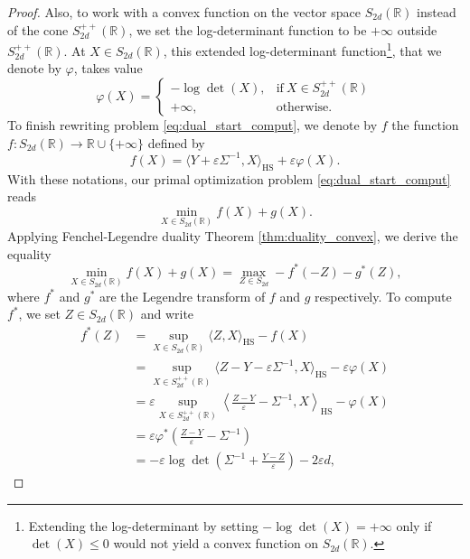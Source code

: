 \documentclass[]{article}
\DeclareMathOperator{\HS}{HS}
\numberwithin{equation}{section}
\theoremstyle{plain}
\begin{document}
{\begin{proof}
	Also, to work with a convex function on the vector space $S_{2d}(\mathbb{R})$ instead of the cone $S_{2d}^{++}(\mathbb{R})$, we set the log-determinant function to be $+\infty$ outside $S_{2d}^{++}(\mathbb{R})$. At $X \in S_{2d}(\mathbb{R})$, this extended log-determinant function\footnote{Extending the log-determinant by setting $-\log\det(X)=+\infty$ only if $\det(X) \leq 0$ would not yield a convex function on $S_{2d}(\mathbb{R})$.}, that we denote by $\varphi$, takes value
	\begin{equation*}
		\varphi(X) = \begin{cases}
			-\log \det(X), & \text{if}~ X \in S_{2d}^{++}(\mathbb{R})\\        + \infty, &\text{otherwise}.
		\end{cases}
	\end{equation*}
	To finish rewriting problem \eqref{eq:dual_start_comput}, we denote by $f$ the function $f : S_{2d}(\mathbb{R}) \rightarrow \mathbb{R} \cup \{+\infty\}$ defined by 
	\begin{equation}
		f(X) = \langle Y + \varepsilon \Sigma^{-1},X \rangle_{\HS} + \varepsilon \varphi(X).
	\end{equation}
	With these notations, our primal optimization problem \eqref{eq:dual_start_comput} reads
	\begin{equation}
		\min_{X \in S_{2d}(\mathbb{R})} f(X) + g(X).
	\end{equation}
	Applying Fenchel-Legendre duality Theorem \ref{thm:duality_convex}, we derive the equality
	\begin{equation}\label{eq:reminder_duality}
		\min_{X \in S_{2d}(\mathbb{R})} f(X) + g(X) = \max_{Z \in S_{2d}} -f^{*}(-Z) - g^*(Z),
	\end{equation}
	where $f^*$ and $g^*$ are the Legendre transform of $f$ and $g$ respectively. To compute $f^*$, we set $Z \in S_{2d}(\mathbb{R})$ and write
	\begin{align*}
		f^*(Z) &= \sup_{X \in S_{2d}(\mathbb{R})} {\langle Z, X \rangle_{\HS} - f(X)}\\
		& = \sup_{X \in S_{2d}^{++}(\mathbb{R})} {\langle Z-Y- \varepsilon \Sigma^{-1}, X \rangle_{\HS} - \varepsilon \varphi(X)} \\
		& = \varepsilon \sup_{X \in S_{2d}^{++}(\mathbb{R})} {\left\langle \frac{Z-Y}{\varepsilon} - \Sigma^{-1}, X \right \rangle_{\HS} -  \varphi(X)} \\
		& = \varepsilon \varphi^*\left(\frac{Z-Y}{\varepsilon} - \Sigma^{-1} \right) \\
		& = - \varepsilon \log \det \left( \Sigma^{-1} +\frac{Y-Z}{\varepsilon}\right) - 2\varepsilon d,

\end{align*}
\end{proof}}
\end{document}
